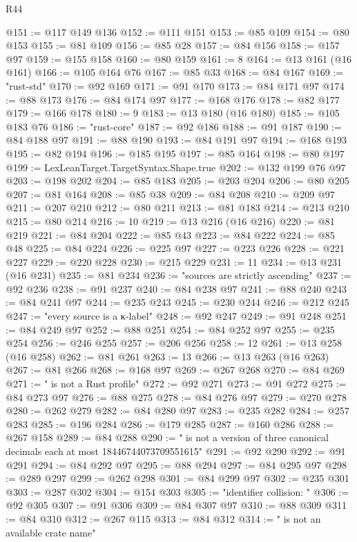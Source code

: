 \begin{lexlean}{R44}
\begin{coremodule}
@151 := @117 @149 @136
@152 := @111 @151
@153 := @85 @109
@154 := @80 @153
@155 := @81 @109
@156 := @85 @28
@157 := @84 @156
@158 := @157 @97
@159 := @155 @158
@160 := @80 @159
@161 := 8
@164 := @13 @161 (@16 @161)
@166 := @105 @164 @76
@167 := @85 @33
@168 := @84 @167
@169 := "rust-std"
@170 := @92 @169
@171 := @91 @170
@173 := @84 @171 @97
@174 := @88 @173
@176 := @84 @174 @97
@177 := @168 @176
@178 := @82 @177
@179 := @166 @178
@180 := 9
@183 := @13 @180 (@16 @180)
@185 := @105 @183 @76
@186 := "rust-core"
@187 := @92 @186
@188 := @91 @187
@190 := @84 @188 @97
@191 := @88 @190
@193 := @84 @191 @97
@194 := @168 @193
@195 := @82 @194
@196 := @185 @195
@197 := @85 @164
@198 := @80 @197
@199 := LexLeanTarget.TargetSyntax.Shape.true
@202 := @132 @199 @76 @97
@203 := @198 @202
@204 := @85 @183
@205 := @203 @204
@206 := @80 @205
@207 := @81 @164
@208 := @85 @38
@209 := @84 @208
@210 := @209 @97
@211 := @207 @210
@212 := @80 @211
@213 := @81 @183
@214 := @213 @210
@215 := @80 @214
@216 := 10
@219 := @13 @216 (@16 @216)
@220 := @81 @219
@221 := @84 @204
@222 := @85 @43
@223 := @84 @222
@224 := @85 @48
@225 := @84 @224
@226 := @225 @97
@227 := @223 @226
@228 := @221 @227
@229 := @220 @228
@230 := @215 @229
@231 := 11
@234 := @13 @231 (@16 @231)
@235 := @81 @234
@236 := "sources are strictly ascending"
@237 := @92 @236
@238 := @91 @237
@240 := @84 @238 @97
@241 := @88 @240
@243 := @84 @241 @97
@244 := @235 @243
@245 := @230 @244
@246 := @212 @245
@247 := "every source is a κ-label"
@248 := @92 @247
@249 := @91 @248
@251 := @84 @249 @97
@252 := @88 @251
@254 := @84 @252 @97
@255 := @235 @254
@256 := @246 @255
@257 := @206 @256
@258 := 12
@261 := @13 @258 (@16 @258)
@262 := @81 @261
@263 := 13
@266 := @13 @263 (@16 @263)
@267 := @81 @266
@268 := @168 @97
@269 := @267 @268
@270 := @84 @269
@271 := " is not a Rust profile"
@272 := @92 @271
@273 := @91 @272
@275 := @84 @273 @97
@276 := @88 @275
@278 := @84 @276 @97
@279 := @270 @278
@280 := @262 @279
@282 := @84 @280 @97
@283 := @235 @282
@284 := @257 @283
@285 := @196 @284
@286 := @179 @285
@287 := @160 @286
@288 := @267 @158
@289 := @84 @288
@290 := " is not a version of three canonical decimals each at most 18446744073709551615"
@291 := @92 @290
@292 := @91 @291
@294 := @84 @292 @97
@295 := @88 @294
@297 := @84 @295 @97
@298 := @289 @297
@299 := @262 @298
@301 := @84 @299 @97
@302 := @235 @301
@303 := @287 @302
@304 := @154 @303
@305 := "identifier collision: "
@306 := @92 @305
@307 := @91 @306
@309 := @84 @307 @97
@310 := @88 @309
@311 := @84 @310
@312 := @267 @115
@313 := @84 @312
@314 := " is not an available crate name"

\end{coremodule}
\end{lexlean}
